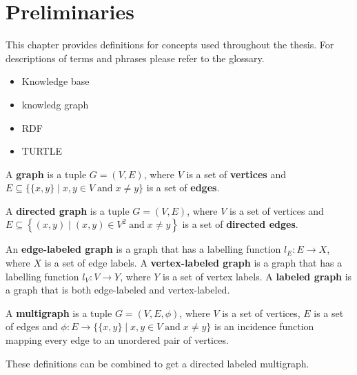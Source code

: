 \chapter{Preliminaries} \label{ch:preliminaries}
This chapter provides definitions for concepts used throughout the thesis. For descriptions of terms and phrases please refer to the glossary.

\begin{itemize}
    \item Knowledge base
    \item knowledg graph 
    \item RDF 
    \item TURTLE
\end{itemize}

\begin{definition}[Graph]
    A \textbf{graph} is a tuple $G = (V, E)$, where $V$ is a set of \textbf{vertices} and $\displaystyle E\subseteq \{\{x,y\}\mid x,y\in V\;{\textrm {and}}\;x\neq y\}$ is a set of \textbf{edges}.
\end{definition}

\begin{definition}
    A \textbf{directed graph} is a tuple $G = (V,E)$, where $V$ is a set of vertices and $\displaystyle E\subseteq \left\{(x,y)\mid (x,y)\in V^{2}\;{\textrm {and}}\;x\neq y\right\}$ is a set of \textbf{directed edges}.
\end{definition}

\begin{definition}
    An \textbf{edge-labeled graph} is a graph that has a labelling function $l_E : E \rightarrow X$, where $X$ is a set of edge labels.
    A \textbf{vertex-labeled graph} is a graph that has a labelling function $l_V : V \rightarrow Y$, where $Y$ is a set of vertex labels.
    A \textbf{labeled graph} is a graph that is both edge-labeled and vertex-labeled.
\end{definition}

\begin{definition}[Multigraph]
    A \textbf{multigraph} is a tuple $\displaystyle G=(V,E,\phi )$, where $V$ is a set of vertices, $E$ is a set of edges and $\displaystyle \phi :E\to \{\{x,y\}\mid x,y\in V\;{\textrm {and}}\;x\neq y\}$ is an incidence function mapping every edge to an unordered pair of vertices.
\end{definition}

\begin{remark}
    These definitions can be combined to get a directed labeled multigraph.
\end{remark}


